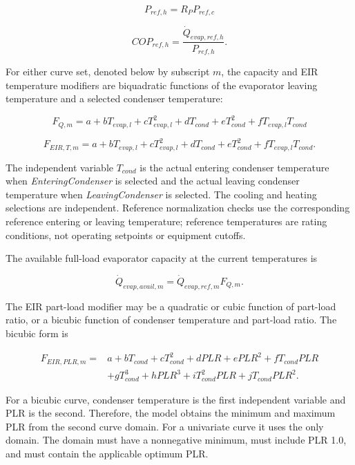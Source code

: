 \begin{equation}
P_{ref,h}=R_P P_{ref,c}
\end{equation}

\begin{equation}
COP_{ref,h}=\frac{\dot Q_{evap,ref,h}}{P_{ref,h}}.
\end{equation}

For either curve set, denoted below by subscript \(m\), the capacity and EIR temperature modifiers are biquadratic functions of the evaporator leaving temperature and a selected condenser temperature:

\begin{equation}
F_{Q,m}=a+bT_{evap,l}+cT_{evap,l}^{2}+dT_{cond}+eT_{cond}^{2}+fT_{evap,l}T_{cond}
\end{equation}

\begin{equation}
F_{EIR,T,m}=a+bT_{evap,l}+cT_{evap,l}^{2}+dT_{cond}+eT_{cond}^{2}+fT_{evap,l}T_{cond}.
\end{equation}

The independent variable \(T_{cond}\) is the actual entering condenser temperature when \emph{EnteringCondenser} is selected and the actual leaving condenser temperature when \emph{LeavingCondenser} is selected. The cooling and heating selections are independent. Reference normalization checks use the corresponding reference entering or leaving temperature; reference temperatures are rating conditions, not operating setpoints or equipment cutoffs.

The available full-load evaporator capacity at the current temperatures is

\begin{equation}
\dot Q_{evap,avail,m}=\dot Q_{evap,ref,m}F_{Q,m}.
\end{equation}

The EIR part-load modifier may be a quadratic or cubic function of part-load ratio, or a bicubic function of condenser temperature and part-load ratio. The bicubic form is

\begin{align}
F_{EIR,PLR,m}={}&a+bT_{cond}+cT_{cond}^{2}+dPLR+ePLR^{2}+fT_{cond}PLR \\
&+gT_{cond}^{3}+hPLR^{3}+iT_{cond}^{2}PLR+jT_{cond}PLR^{2}.
\end{align}

For a bicubic curve, condenser temperature is the first independent variable and PLR is the second. Therefore, the model obtains the minimum and maximum PLR from the second curve domain. For a univariate curve it uses the only domain. The domain must have a nonnegative minimum, must include PLR 1.0, and must contain the applicable optimum PLR.

